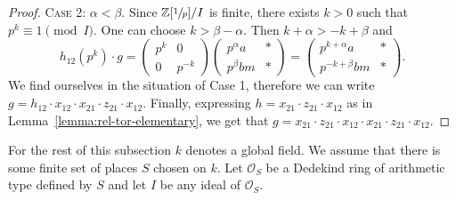 \begin{proof}
\textsc{Case 2:} $\alpha<\beta$. 
Since $\mathbb{Z}[\sfrac{1}{p}]/I$ is finite, there exists $k>0$ such that $p^k\equiv 1\pmod I$.
One can choose $k>\beta-\alpha$.
Then $k+\alpha>-k+\beta$ and
\[ h_{12}\left(p^k\right)\cdot g =
\begin{pmatrix} p^k & 0 \\ 0 & p^{-k} \end{pmatrix}
\begin{pmatrix} p^\alpha a & * \\ p^\beta bm & * \end{pmatrix}=
\begin{pmatrix} p^{k+\alpha} a & * \\ p^{-k+\beta} bm & * \end{pmatrix}. \]
We find ourselves in the situation of Case 1, therefore we can write $g=h_{12}\cdot x_{12} \cdot x_{21} \cdot z_{21} \cdot x_{12}$.
Finally, expressing $h=x_{21}\cdot z_{21}\cdot x_{12}$ as in Lemma~\ref{lemma:rel-tor-elementary}, we get that $g=x_{21} \cdot z_{21} \cdot x_{12} \cdot x_{21} \cdot z_{21} \cdot x_{12}$.
\end{proof}

For the rest of this subsection $k$ denotes a global field. We assume that there is some finite set of places $S$ chosen on $k$. 
Let $\mathcal{O}_S$ be a Dedekind ring of arithmetic type defined by $S$ and let $I$ be any ideal of $\mathcal{O}_S$.

